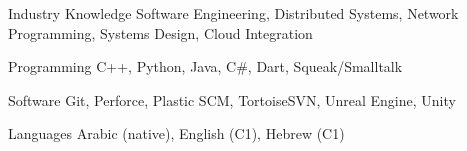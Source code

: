 
\begin{cvskills}

  \cvskill
    {Industry Knowledge}
    {Software Engineering, Distributed Systems, Network Programming, Systems Design, Cloud Integration}

  \cvskill
    {Programming}
    {C++, Python, Java, C\#, Dart, Squeak/Smalltalk}

  \cvskill
    {Software}
    {Git, Perforce, Plastic SCM, TortoiseSVN, Unreal Engine, Unity}

  \cvskill
    {Languages}
    {Arabic (native), English (C1), Hebrew (C1)}

\end{cvskills}